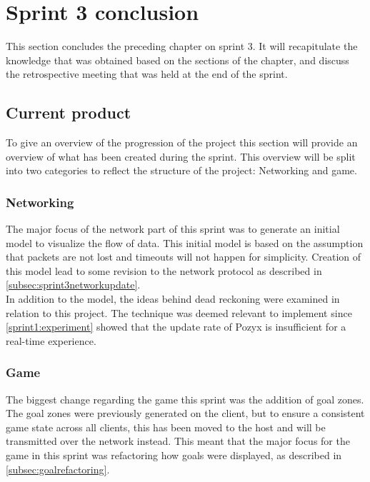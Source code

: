\section{Sprint 3 conclusion}\label{sec:sprint3conclusion}
This section concludes the preceding chapter on sprint 3.
It will recapitulate the knowledge that was obtained based on the sections of the chapter, and discuss the retrospective meeting that was held at the end of the sprint.

\subsection{Current product}
To give an overview of the progression of the project this section will provide an overview of what has been created during the sprint.
This overview will be split into two categories to reflect the structure of the project: Networking and game.

\subsubsection{Networking}
The major focus of the network part of this sprint was to generate an initial \uppaal model to visualize the flow of data.
This initial model is based on the assumption that packets are not lost and timeouts will not happen for simplicity.
Creation of this model lead to some revision to the network protocol as described in \autoref{subsec:sprint3networkupdate}.\\
In addition to the \uppaal model, the ideas behind dead reckoning were examined in relation to this project.
The technique was deemed relevant to implement since \autoref{sprint1:experiment} showed that the update rate of Pozyx is insufficient for a real-time experience.

\subsubsection{Game}
The biggest change regarding the game this sprint was the addition of goal zones.
The goal zones were previously generated on the client, but to ensure a consistent game state across all clients, this has been moved to the host and will be transmitted over the network instead.
This meant that the major focus for the game in this sprint was refactoring how goals were displayed, as described in \autoref{subsec:goalrefactoring}.


